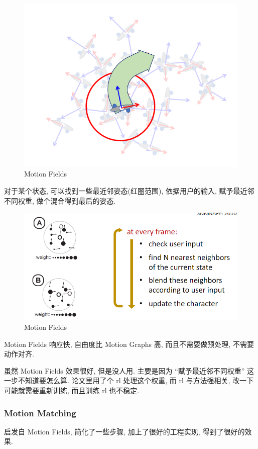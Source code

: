 \begin{figure}[!htb]
    \centering
    \includegraphics[width=0.618\linewidth]{pic/1056/Motion Fields}
    \caption{Motion Fields}
\end{figure}

对于某个状态, 可以找到一些最近邻姿态(红圈范围), 依据用户的输入, 赋予最近邻不同权重, 做个混合得到最后的姿态.

\begin{figure}[!htb]
    \centering
    \includegraphics[width=0.88\linewidth]{pic/1056/Motion Fields2.png}
    \caption{Motion Fields}
\end{figure}

Motion Fields 响应快, 自由度比 Motion Graphs 高, 而且不需要做预处理, 不需要动作对齐. 

虽然 Motion Fields 效果很好, 但是没人用. 主要是因为 ``赋予最近邻不同权重'' 这一步不知道要怎么算. 论文里用了个 rl 处理这个权重, 而 rl 与方法强相关, 改一下可能就需要重新训练, 而且训练 rl 也不稳定. 

\subsubsection{Motion Matching}
启发自 Motion Fields, 简化了一些步骤, 加上了很好的工程实现, 得到了很好的效果. 


